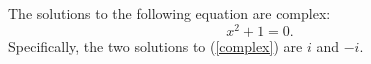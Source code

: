 The solutions to the following equation are complex: 
\begin{equation}\label{complex}
x^2+1=0.
\end{equation}
Specifically, the two solutions to (\ref{complex}) are
$i$ and $-i$.
